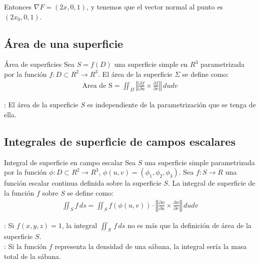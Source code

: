 \documentclass[a4paper, twoside]{article}
\numberwithin{equation}{section}
\numberwithin{figure}{section}
\numberwithin{table}{section}
\begin{document}
Entonces $\nabla F=(2x,0,1)$, y tenemos que el vector normal al punto es $(2x_0,0,1)$.

\subsection{Área de una superficie }
\begin{definicion*}{Área de superficies}
	Sea $S=f(D)$ una superficie simple en $R^3$ parametrizada por la función $f:D \subset R^2 \to R^3$. El área de la superficie $\Sigma$ se define como:
	\begin{align}
		\mbox{Area de S} = \iint_{D} \left\Vert \frac{\partial f}{\partial u} \times \frac{\partial f}{\partial v} \right\Vert \, dudv
	\end{align}
	
	: El área de la superficie $S$ es independiente de la parametrización que se tenga de ella.
\end{definicion*}

\subsection{Integrales de superficie de campos escalares}
\begin{definicion*}{Integral de superficie en campo escalar}
	Sea $S$ una superficie simple parametrizada por la función $\phi: D \subset R^2 \to R^3$, $\phi(u,v) = (\phi_1,\phi_2,\phi_3)$. Sea $f: S \to R$ una función escalar continua definida sobre la superficie $S$. La integral de superficie de la función $f$ sobre $S$ se define como:
	\begin{align}
		\iint_{S} f\, ds = \iint_{S} f(\phi(u,v)) \cdot \left\Vert \frac{\partial\phi}{\partial u} \times \frac{\partial\phi}{\partial v} \right\Vert \, dudv
	\end{align}
	
	: Si $f(x,y,z)=1$, la integral $\iint_{S}\, f\, ds$ no es más que la definición de área de la superficie $S$.\\

	: Si la función $f$ representa la densidad de una sábana, la integral sería la masa total de la sábana.
\end{definicion*}
\end{document}
